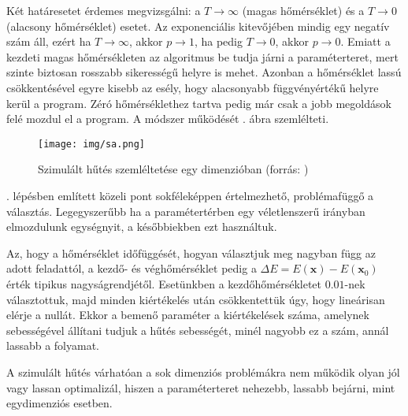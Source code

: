 \documentclass[12pt]{article}
\begin{document}
Két határesetet érdemes megvizsgálni: a $T \rightarrow \infty$ (magas hőmérséklet) és a $T \rightarrow 0$ (alacsony hőmérséklet) esetet. Az exponenciális kitevőjében mindig egy negatív szám áll, ezért ha $T \rightarrow \infty$, akkor $p \rightarrow 1$, ha pedig $T \rightarrow 0$, akkor $p \rightarrow 0$.
Emiatt a kezdeti magas hőmérsékleten az algoritmus be tudja járni a paraméterteret, mert szinte biztosan rosszabb sikerességű helyre is mehet. Azonban a hőmérséklet lassú csökkentésével egyre kisebb az esély, hogy alacsonyabb függvényértékű helyre kerül a program. Zéró hőmérséklethez tartva pedig már csak a jobb megoldások felé mozdul el a program. A módszer működését . ábra szemlélteti.
\begin{figure}[H]
	\centering
	\texttt{[image: img/sa.png]}
	\caption{Szimulált hűtés szemléltetése egy dimenzióban (forrás: \cite{simulated_annealing_fig})}
	\label{fig:simulated_annealing_szemleltetes}
\end{figure}

. lépésben említett közeli pont sokféleképpen értelmezhető, problémafüggő a választás. Legegyszerűbb ha a paramétertérben egy véletlenszerű irányban elmozdulunk egységnyit, a későbbiekben ezt használtuk.

Az, hogy a hőmérséklet időfüggését, hogyan választjuk meg nagyban függ az adott feladattól, a kezdő- és véghőmérséklet pedig a $\Delta E = E(\mathbf{x}) - E(\mathbf{x}_0)$ érték tipikus nagyságrendjétől. %
Esetünkben a kezdőhőmérsékletet $0.01$-nek választottuk, majd minden kiértékelés után csökkentettük úgy, hogy lineárisan elérje a nullát. Ekkor a bemenő paraméter a kiértékelések száma, amelynek sebességével állítani tudjuk a hűtés sebességét, minél nagyobb ez a szám, annál lassabb a folyamat.

A szimulált hűtés várhatóan a sok dimenziós problémákra nem működik olyan jól vagy lassan optimalizál, hiszen a paraméterteret nehezebb, lassabb bejárni, mint egydimenziós esetben. %
\end{document}
